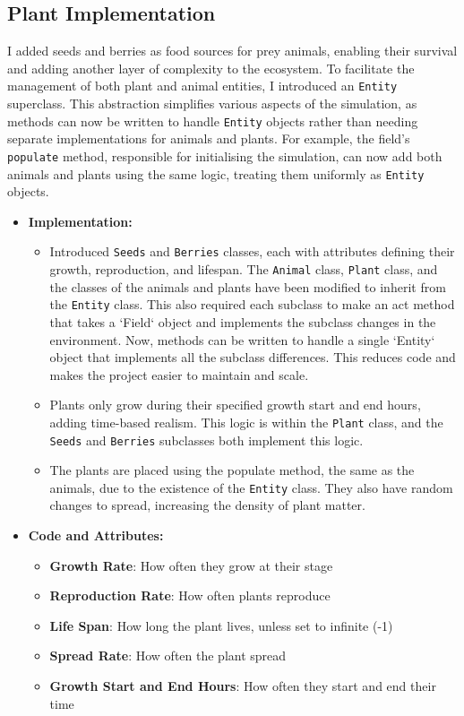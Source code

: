 \documentclass{article}
\begin{document}
\subsection{Plant Implementation}

I added seeds and berries as food sources for prey animals, enabling their survival and adding another layer of complexity to the ecosystem. To facilitate the management of both plant and animal entities, I introduced an \texttt{Entity} superclass. This abstraction simplifies various aspects of the simulation, as methods can now be written to handle \texttt{Entity} objects rather than needing separate implementations for animals and plants. For example, the field's \texttt{populate} method, responsible for initialising the simulation, can now add both animals and plants using the same logic, treating them uniformly as \texttt{Entity} objects.

\begin{itemize}
    \item \textbf{Implementation:}
        \begin{itemize}
            \item Introduced \texttt{Seeds} and \texttt{Berries} classes, each with attributes defining their growth, reproduction, and lifespan. The \texttt{Animal} class, \texttt{Plant} class, and the classes of the animals and plants have been modified to inherit from the \texttt{Entity} class. This also required each subclass to make an act method that takes a `Field` object and implements the subclass changes in the environment. Now, methods can be written to handle a single `Entity` object that implements all the subclass differences. This reduces code and makes the project easier to maintain and scale.
            \item Plants only grow during their specified growth start and end hours, adding time-based realism. This logic is within the \texttt{Plant} class, and the \texttt{Seeds} and \texttt{Berries} subclasses both implement this logic.
            \item The plants are placed using the populate method, the same as the animals, due to the existence of the \texttt{Entity} class. They also have random changes to spread, increasing the density of plant matter.
        \end{itemize}
     \item \textbf{Code and Attributes:}
        \begin{itemize}
         \item \textbf{Growth Rate}: How often they grow at their stage
         \item \textbf{Reproduction Rate}: How often plants reproduce
         \item \textbf{Life Span}: How long the plant lives, unless set to infinite (-1)
         \item \textbf{Spread Rate}: How often the plant spread
         \item \textbf{Growth Start and End Hours}: How often they start and end their time
        \end{itemize}
\end{itemize}
\end{document}
